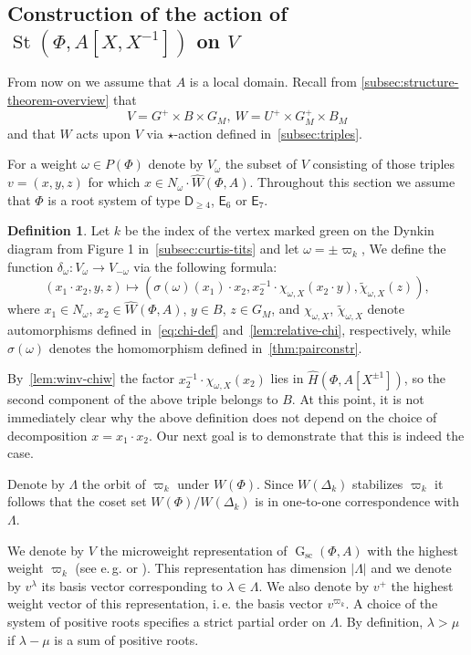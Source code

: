 \documentclass[oneside, 10pt]{amsart}
\DeclareMathOperator{\St}{St}
\DeclareMathOperator{\G}{G}
\newcommand{\Gsc}{\G_\mathrm{sc}}
\newcommand{\rD}{\mathsf{D}}
\newcommand{\rE}{\mathsf{E}}
\newcommand{\StW}{\widehat{W}}
\newcommand{\StH}{\widehat{H}}
\newcommand{\inv}{^{-1}}
\numberwithin{equation}{section}
\numberwithin{thm}{section}
\numberwithin{lemma}{section}
\theoremstyle{definition}
\newtheorem{dfn}[lemma]{Definition}
\theoremstyle{remark}
\begin{document}
\subsection{Construction of the action of \texorpdfstring{$\St(\Phi, A[X, X\inv])$}{St(Ф, A[X, X⁻¹])} on $V$} \label{sec:construction-delta}
From now on we assume that $A$ is a local domain.
Recall from \cref{subsec:structure-theorem-overview} that \[V = G^+ \times B \times G_M,\ W = U^+ \times G_M^+ \times B_M\]
and that $W$ acts upon $V$ via $\star$-action defined in~\cref{subsec:triples}.

For a weight $\omega \in P(\Phi)$ denote by $V_\omega$ the subset of $V$ consisting of those triples $v = (x, y, z)$ for which $x \in N_\omega\cdot \StW(\Phi, A)$.
Throughout this section we assume that $\Phi$ is a root system of type $\rD_{\geq 4}$, $\rE_6$ or $\rE_7$.

\begin{dfn} \label{sigma-def}
Let $k$ be the index of the vertex marked green on the Dynkin diagram from Figure 1 in~\cref{subsec:curtis-tits} and let $\omega = \pm \varpi_k$,
We define the function $\delta_\omega \colon V_\omega \to V_{-\omega}$ via the following formula:
\begin{equation} \label{eq:sigma-def} (x_1 \cdot x_2, y, z) \mapsto (\sigma(\omega)(x_1)\cdot x_2, x_2^{-1} \cdot \chi_{\omega, X}(x_2 \cdot y), \widetilde{\chi}_{\omega, X}(z)), \end{equation}
where $x_1 \in N_\omega$, $x_2 \in \StW(\Phi, A)$, $y \in B$, $z \in G_M$, and
$\chi_{\omega, X}$, $\widetilde{\chi}_{\omega, X}$ denote automorphisms defined in~\eqref{eq:chi-def} and~\cref{lem:relative-chi}, respectively,
while $\sigma(\omega)$ denotes the homomorphism defined in~\cref{thm:pairconstr}.
\end{dfn}
By~\cref{lem:winv-chiw} the factor $x_2^{-1} \cdot \chi_{\omega, X}(x_2)$ lies in $\StH(\Phi, A[X^{\pm 1}])$,
so the second component of the above triple belongs to $B$.
At this point, it is not immediately clear why the above definition does not depend on the choice of decomposition $x = x_1 \cdot x_2$.
Our next goal is to demonstrate that this is indeed the case.

Denote by $\Lambda$ the orbit of $\varpi_k$ under $W(\Phi)$.
Since $W(\Delta_k)$ stabilizes $\varpi_k$ it follows that the coset set $W(\Phi)/W(\Delta_k)$ is in one-to-one correspondence with $\Lambda$.

We denote by $V$ the microweight representation of $\Gsc(\Phi, A)$ with the highest weight $\varpi_k$ (see e.\,g. \cite[\S~2]{Ge17} or \cite[\S~1.1]{V00}).
This representation has dimension $|\Lambda|$ and we denote by $v^\lambda$ its basis vector corresponding to $\lambda \in \Lambda$.
We also denote by $v^+$ the highest weight vector of this representation, i.\,e. the basis vector $v^{\varpi_k}$.
A choice of the system of positive roots specifies a strict partial order on $\Lambda$.
By definition, $\lambda > \mu$ if $\lambda - \mu$ is a sum of positive roots.
\end{document}
